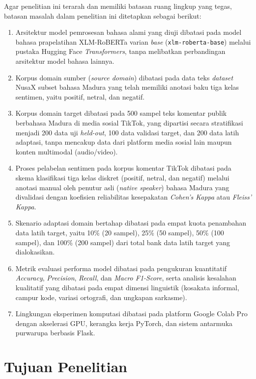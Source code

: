 Agar penelitian ini terarah dan memiliki batasan ruang lingkup yang tegas, batasan masalah dalam penelitian ini ditetapkan sebagai berikut:
\begin{enumerate}
    \item Arsitektur model pemrosesan bahasa alami yang diuji dibatasi pada model bahasa prapelatihan XLM-RoBERTa varian \textit{base} (\texttt{xlm-roberta-base}) melalui pustaka Hugging Face \textit{Transformers}, tanpa melibatkan perbandingan arsitektur model bahasa lainnya.
    \item Korpus domain sumber (\textit{source domain}) dibatasi pada data teks \textit{dataset} NusaX subset bahasa Madura yang telah memiliki anotasi baku tiga kelas sentimen, yaitu positif, netral, dan negatif.
    \item Korpus domain target dibatasi pada 500 sampel teks komentar publik berbahasa Madura di media sosial TikTok, yang dipartisi secara stratifikasi menjadi 200 data uji \textit{held-out}, 100 data validasi target, dan 200 data latih adaptasi, tanpa mencakup data dari platform media sosial lain maupun konten multimodal (audio/video).
    \item Proses pelabelan sentimen pada korpus komentar TikTok dibatasi pada skema klasifikasi tiga kelas diskret (positif, netral, dan negatif) melalui anotasi manual oleh penutur asli (\textit{native speaker}) bahasa Madura yang divalidasi dengan koefisien reliabilitas kesepakatan \textit{Cohen's Kappa} atau \textit{Fleiss' Kappa}.
    \item Skenario adaptasi domain bertahap dibatasi pada empat kuota penambahan data latih target, yaitu 10\% (20 sampel), 25\% (50 sampel), 50\% (100 sampel), dan 100\% (200 sampel) dari total bank data latih target yang dialokasikan.
    \item Metrik evaluasi performa model dibatasi pada pengukuran kuantitatif \textit{Accuracy}, \textit{Precision}, \textit{Recall}, dan \textit{Macro F1-Score}, serta analisis kesalahan kualitatif yang dibatasi pada empat dimensi linguistik (kosakata informal, campur kode, variasi ortografi, dan ungkapan sarkasme).
    \item Lingkungan eksperimen komputasi dibatasi pada platform Google Colab Pro dengan akselerasi GPU, kerangka kerja PyTorch, dan sistem antarmuka purwarupa berbasis Flask.
\end{enumerate}

\section{Tujuan Penelitian}


